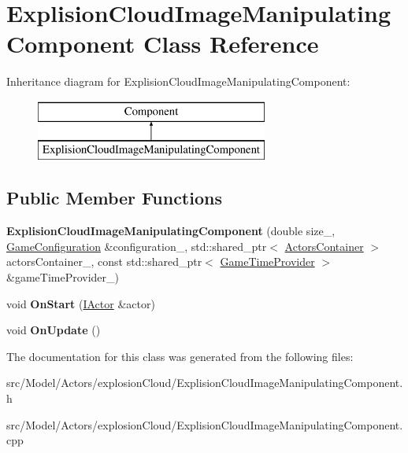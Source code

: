 \hypertarget{classExplisionCloudImageManipulatingComponent}{}\section{Explision\+Cloud\+Image\+Manipulating\+Component Class Reference}
\label{classExplisionCloudImageManipulatingComponent}
Inheritance diagram for Explision\+Cloud\+Image\+Manipulating\+Component\+:\begin{figure}[H]
\begin{center}
\leavevmode
\includegraphics[height=2.000000cm]{classExplisionCloudImageManipulatingComponent}
\end{center}
\end{figure}
\subsection*{Public Member Functions}
\begin{DoxyCompactItemize}
\item 
{\bfseries Explision\+Cloud\+Image\+Manipulating\+Component} (double size\+\_\+, \hyperlink{classGameConfiguration}{Game\+Configuration} \&configuration\+\_\+, std\+::shared\+\_\+ptr$<$ \hyperlink{classActorsContainer}{Actors\+Container} $>$ actors\+Container\+\_\+, const std\+::shared\+\_\+ptr$<$ \hyperlink{classGameTimeProvider}{Game\+Time\+Provider} $>$ \&game\+Time\+Provider\+\_\+)\hypertarget{classExplisionCloudImageManipulatingComponent_ab9733017854e575bec1ecada80ed84f4}{}\label{classExplisionCloudImageManipulatingComponent_ab9733017854e575bec1ecada80ed84f4}

\item 
void {\bfseries On\+Start} (\hyperlink{classIActor}{I\+Actor} \&actor)\hypertarget{classExplisionCloudImageManipulatingComponent_a6e850d437fe31981a9e972c068dd2823}{}\label{classExplisionCloudImageManipulatingComponent_a6e850d437fe31981a9e972c068dd2823}

\item 
void {\bfseries On\+Update} ()\hypertarget{classExplisionCloudImageManipulatingComponent_ab562cbcd8802a2c2f396bdf8c4094321}{}\label{classExplisionCloudImageManipulatingComponent_ab562cbcd8802a2c2f396bdf8c4094321}

\end{DoxyCompactItemize}


The documentation for this class was generated from the following files\+:\begin{DoxyCompactItemize}
\item 
src/\+Model/\+Actors/explosion\+Cloud/Explision\+Cloud\+Image\+Manipulating\+Component.\+h\item 
src/\+Model/\+Actors/explosion\+Cloud/Explision\+Cloud\+Image\+Manipulating\+Component.\+cpp\end{DoxyCompactItemize}
